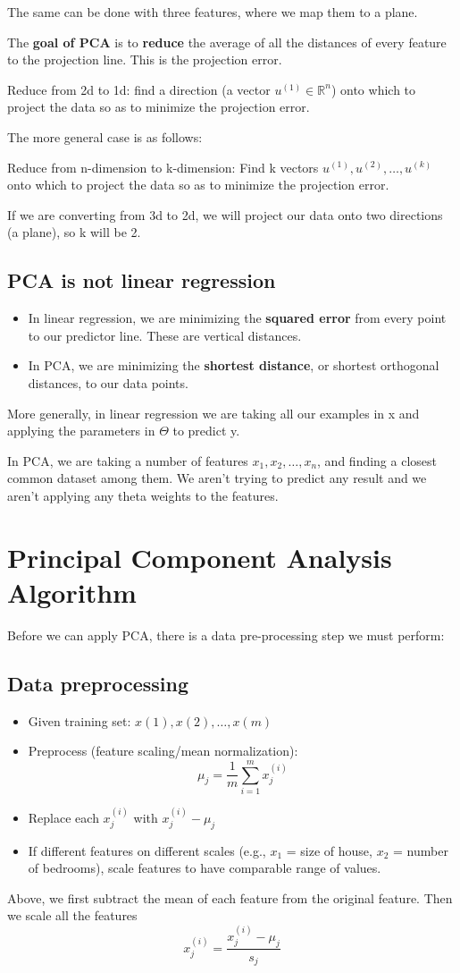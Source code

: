 The same can be done with three features, where we map them to a plane.

The \textbf{goal of PCA} is to \textbf{reduce} the average of all the distances of every feature to the projection line. This is the projection error.

Reduce from 2d to 1d: find a direction (a vector $u^{(1)} \in \mathbb{R}^n$) onto which to project the data so as to minimize the projection error.

The more general case is as follows:

Reduce from n-dimension to k-dimension: Find k vectors $u^{(1)}, u^{(2)}, \dots, u^{(k)}$ onto which to project the data so as to minimize the projection error.

If we are converting from 3d to 2d, we will project our data onto two directions (a plane), so k will be 2.
\subsection{PCA is not linear regression}
\begin{itemize}
	\item In linear regression, we are minimizing the \textbf{squared error} from every point to our predictor line. These are vertical distances.
	\item In PCA, we are minimizing the \textbf{shortest distance}, or shortest orthogonal distances, to our data points.
\end{itemize}
More generally, in linear regression we are taking all our examples in x and applying the parameters in $\Theta$ to predict y.

In PCA, we are taking a number of features $x_1, x_2, \dots, x_n$, and finding a closest common dataset among them. We aren't trying to predict any result and we aren't applying any theta weights to the features.
\section{Principal Component Analysis Algorithm}
Before we can apply PCA, there is a data pre-processing step we must perform:
\subsection{Data preprocessing}
\begin{itemize}
	\item Given training set: $x(1),x(2),\dots,x(m)$
	\item Preprocess (feature scaling/mean normalization): $$\mu_j = \dfrac{1}{m}\sum^m_{i=1}x_j^{(i)} $$
	\item Replace each $x_j^{(i)}$ with $x_j^{(i)} - \mu_j$
	\item If different features on different scales (e.g., $x_1$ = size of house, $x_2 $ = number of bedrooms), scale features to have comparable range of values.
\end{itemize}
Above, we first subtract the mean of each feature from the original feature. Then we scale all the features $$x_j^{(i)} = \dfrac{x_j^{(i)} - \mu_j}{s_j}$$

